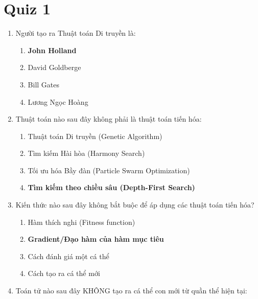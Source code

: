 \documentclass{book}
\begin{document}
\section{Quiz 1}
\begin{enumerate}
    \item Người tạo ra Thuật toán Di truyền là:
    \begin{multicols}{2}
        \begin{enumerate}[label=\Alph*]
            \item \textbf{John Holland}
            \item David Goldberge
            \item Bill Gates
            \item Lương Ngọc Hoàng
        \end{enumerate}
    \end{multicols}
    \item Thuật toán nào sau đây không phải là thuật toán tiến hóa:
    \begin{multicols}{2}
        \begin{enumerate}[label=\Alph*]
            \item Thuật toán Di truyền (Genetic Algorithm)
            \item Tìm kiếm Hài hòa (Harmony Search)
            \item Tối ưu hóa Bầy đàn (Particle Swarm Optimization)
            \item \textbf{Tìm kiếm theo chiều sâu (Depth-First Search)}
        \end{enumerate}
    \end{multicols}
    \item Kiến thức nào sau đây không bắt buộc để áp dụng các thuật toán tiến hóa?
    \begin{multicols}{2}
        \begin{enumerate}[label=\Alph*]
            \item Hàm thích nghi (Fitness function)
            \item \textbf{Gradient/Đạo hàm của hàm mục tiêu}
            \item Cách đánh giá một cá thể
            \item Cách tạo ra cá thể mới
        \end{enumerate}
    \end{multicols}
    \item Toán tử nào sau đây KHÔNG tạo ra cá thể con mới từ quần thể hiện tại:
    \begin{multicols}{2}

\end{multicols}
\end{enumerate}
\end{document}
